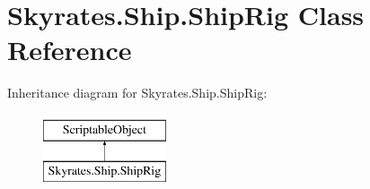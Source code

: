 \hypertarget{class_skyrates_1_1_ship_1_1_ship_rig}{\section{Skyrates.\-Ship.\-Ship\-Rig Class Reference}
\label{class_skyrates_1_1_ship_1_1_ship_rig}
}
Inheritance diagram for Skyrates.\-Ship.\-Ship\-Rig\-:\begin{figure}[H]
\begin{center}
\leavevmode
\includegraphics[height=2.000000cm]{class_skyrates_1_1_ship_1_1_ship_rig}
\end{center}
\end{figure}
